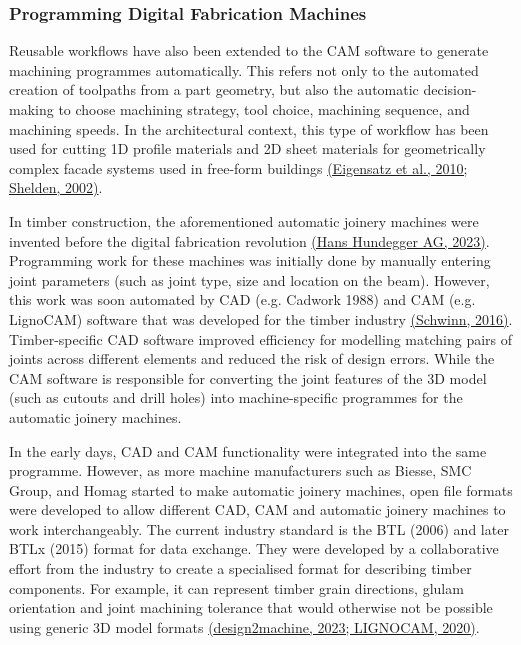 \documentclass[11pt]{book}
\begin{document}
\subsubsection{Programming Digital Fabrication Machines}

Reusable workflows have also been extended to the CAM software to generate machining programmes automatically. This refers not only to the automated creation of toolpaths from a part geometry, but also the automatic decision-making to choose machining strategy, tool choice, machining sequence, and machining speeds. In the architectural context, this type of workflow has been used for cutting 1D profile materials and 2D sheet materials for geometrically complex facade systems used in free-form buildings \href{https://www.zotero.org/google-docs/?1ZGSxs}{(Eigensatz et al., 2010; Shelden, 2002)}.

In timber construction, the aforementioned automatic joinery machines were invented before the digital fabrication revolution \href{https://www.zotero.org/google-docs/?BhPxsy}{(Hans Hundegger AG, 2023)}. Programming work for these machines was initially done by manually entering joint parameters (such as joint type, size and location on the beam). However, this work was soon automated by CAD (e.g. Cadwork 1988) and CAM (e.g. LignoCAM) software that was developed for the timber industry \href{https://www.zotero.org/google-docs/?wIJjiT}{(Schwinn, 2016)}. Timber-specific CAD software improved efficiency for modelling matching pairs of joints across different elements and reduced the risk of design errors. While the CAM software is responsible for converting the joint features of the 3D model (such as cutouts and drill holes) into machine-specific programmes for the automatic joinery machines.

In the early days, CAD and CAM functionality were integrated into the same programme. However, as more machine manufacturers such as Biesse, SMC Group, and Homag started to make automatic joinery machines, open file formats\textbf{ }were developed to allow different CAD, CAM and automatic joinery machines to work interchangeably. The current industry standard is the BTL (2006) and later BTLx (2015) format for data exchange. They were developed by a collaborative effort from the industry to create a specialised format for describing timber components. For example, it can represent timber grain directions, glulam orientation and joint machining tolerance that would otherwise not be possible using generic 3D model formats \href{https://www.zotero.org/google-docs/?EuPkAC}{(}\href{https://www.zotero.org/google-docs/?EuPkAC}{design2machine}\href{https://www.zotero.org/google-docs/?EuPkAC}{, 2023; LIGNOCAM, 2020)}. 
\end{document}
